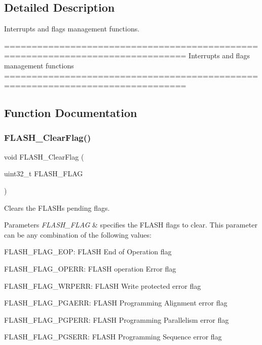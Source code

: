 \subsection{Detailed Description}
Interrupts and flags management functions. 

\begin{DoxyVerb} ===============================================================================
                  Interrupts and flags management functions
 ===============================================================================  \end{DoxyVerb}
 

\subsection{Function Documentation}
\mbox{\label{group__FLASH__Group4_gac4be1d486483fa5cd70ec77d44ca8f87}} 
\subsubsection{F\+L\+A\+S\+H\+\_\+\+Clear\+Flag()}
{\footnotesize\ttfamily void F\+L\+A\+S\+H\+\_\+\+Clear\+Flag (\begin{DoxyParamCaption}\item[{uint32\+\_\+t}]{F\+L\+A\+S\+H\+\_\+\+F\+L\+AG }\end{DoxyParamCaption})}



Clears the F\+L\+A\+SH\textquotesingle{}s pending flags. 


\begin{DoxyParams}{Parameters}
{\em F\+L\+A\+S\+H\+\_\+\+F\+L\+AG} & specifies the F\+L\+A\+SH flags to clear. This parameter can be any combination of the following values\+: \begin{DoxyItemize}
\item F\+L\+A\+S\+H\+\_\+\+F\+L\+A\+G\+\_\+\+E\+OP\+: F\+L\+A\+SH End of Operation flag \item F\+L\+A\+S\+H\+\_\+\+F\+L\+A\+G\+\_\+\+O\+P\+E\+RR\+: F\+L\+A\+SH operation Error flag \item F\+L\+A\+S\+H\+\_\+\+F\+L\+A\+G\+\_\+\+W\+R\+P\+E\+RR\+: F\+L\+A\+SH Write protected error flag \item F\+L\+A\+S\+H\+\_\+\+F\+L\+A\+G\+\_\+\+P\+G\+A\+E\+RR\+: F\+L\+A\+SH Programming Alignment error flag \item F\+L\+A\+S\+H\+\_\+\+F\+L\+A\+G\+\_\+\+P\+G\+P\+E\+RR\+: F\+L\+A\+SH Programming Parallelism error flag \item F\+L\+A\+S\+H\+\_\+\+F\+L\+A\+G\+\_\+\+P\+G\+S\+E\+RR\+: F\+L\+A\+SH Programming Sequence error flag \end{DoxyItemize}
\\
\hline
\end{DoxyParams}

